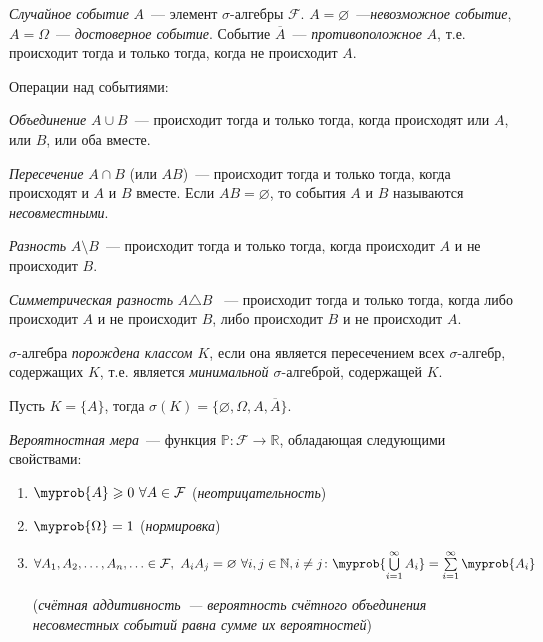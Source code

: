 \begin{defn}
    {\it Случайное событие} $A$~--- элемент $\sigma \text{-алгебры~} \mathcal{F}$. $A=\varnothing$~---{\it невозможное событие}, $A=\Omega$~--- {\it достоверное событие}. Событие $\overline{A}$~--- {\it противоположное} $A$, т.е. происходит тогда и только тогда, когда не происходит $A$.

Операции над событиями:

\begin{compactlist}
    \item {\it Объединение} $A \cup B$~--- происходит тогда и только тогда, когда происходят или $A$, или $B$, или оба вместе.
    \item {\it Пересечение} $A \cap B$ (или $AB$)~--- происходит тогда и только тогда, когда происходят и $A$ и $B$ вместе. Если $AB = \varnothing$, то события $A$ и $B$ называются {\it несовместными}.
    \item {\it Разность} $A \setminus B$~--- происходит тогда и только тогда, когда происходит $A$ и не происходит $B$.
    \item {\it Симметрическая разность} $A \triangle B$ ~--- происходит тогда и только тогда, когда либо происходит $A$ и не происходит $B$, либо происходит $B$ и не происходит $A$.
\end{compactlist}
\end{defn}

\begin{defn}
    $\sigma \text{-алгебра}$ {\it порождена классом $K$}, если она является пересечением всех $\sigma \text{-алгебр}$, содержащих $K$, т.е. является {\it минимальной $\sigma \text{-алгеброй}$}, содержащей $K$.
\end{defn}

\begin{exmp}
    Пусть $K = \{A\}$, тогда $\sigma (K) = \{\varnothing, \Omega, A, \overline{A}\}$.
\end{exmp}

\begin{defn}
    {\it Вероятностная мера}~--- функция $\mathbb{P}: \mathcal{F} \rightarrow \mathbb{R}$, обладающая следующими свойствами:

\begin{enumerate}
    \item $\myprob{A} \geqslant 0~\forall A \in \mathcal{F}$ ({\it неотрицательность})
    \item $\myprob{\Omega} = 1$ ({\it нормировка})
    \item $\forall A_1, A_2, \ldots, A_n, \ldots \in \mathcal{F},~ A_{i}A_{j} = \varnothing~ \forall i, j \in \mathbb{N}, i \ne j \colon \myprob{\bigcup\limits_{i=1}^\infty A_i} = \sum\limits_{i=1}^\infty \myprob{A_i}$
    
    ({\it счётная аддитивность~--- вероятность счётного объединения несовместных событий равна сумме их вероятностей})
\end{enumerate}
\end{defn}

